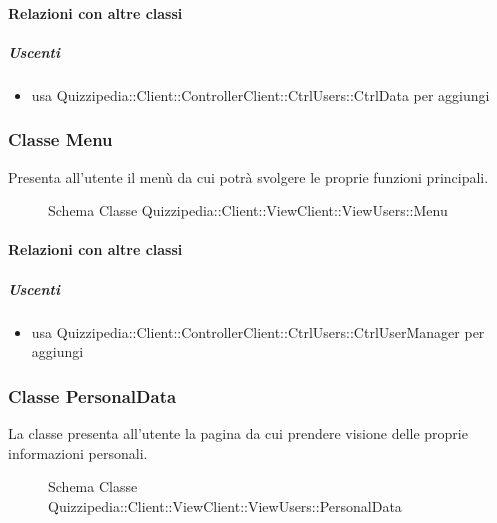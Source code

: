 \paragraph{Relazioni con altre classi}
\subparagraph{Uscenti}
\begin{itemize}
\item usa Quizzipedia::Client::ControllerClient::CtrlUsers::CtrlData per aggiungi
\end{itemize}
\subsubsection{Classe Menu}
Presenta all'utente il menù da cui potrà svolgere le proprie funzioni principali.
\begin{figure}[H]
\centering
\noindent{}
\caption[Schema Classe Menu]{Schema Classe Quizzipedia::Client::ViewClient::ViewUsers::Menu}
\end{figure}
\paragraph{Relazioni con altre classi}
\subparagraph{Uscenti}
\begin{itemize}
\item usa Quizzipedia::Client::ControllerClient::CtrlUsers::CtrlUserManager per aggiungi
\end{itemize}
\subsubsection{Classe PersonalData}
La classe presenta all'utente la pagina da cui prendere visione delle proprie informazioni personali.
\begin{figure}[H]
\centering
\noindent{}
\caption[Schema Classe PersonalData]{Schema Classe Quizzipedia::Client::ViewClient::ViewUsers::PersonalData}
\end{figure}
